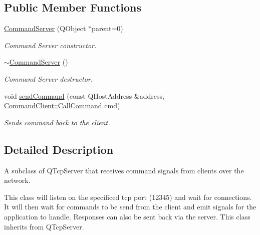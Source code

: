\subsection*{\-Public \-Member \-Functions}
\begin{DoxyCompactItemize}
\item 
\hyperlink{class_command_server_ae341a512a49c2453c306f5e4d576c052}{\-Command\-Server} (\-Q\-Object $\ast$parent=0)
\begin{DoxyCompactList}\small\item\em \-Command \-Server constructor. \end{DoxyCompactList}\item 
\hyperlink{class_command_server_a89f1d55bb111f7954d022e0c63d3b87f}{$\sim$\-Command\-Server} ()
\begin{DoxyCompactList}\small\item\em \-Command \-Server destructor. \end{DoxyCompactList}\item 
void \hyperlink{class_command_server_a1fc3321611893adbaecc4bdeca585570}{send\-Command} (const \-Q\-Host\-Address \&address, \hyperlink{class_command_client_aa99b17193724fef8aed2b2c724b0c243}{\-Command\-Client\-::\-Call\-Command} cmd)
\begin{DoxyCompactList}\small\item\em \-Sends command back to the client. \end{DoxyCompactList}\end{DoxyCompactItemize}


\subsection{\-Detailed \-Description}
\-A subclass of \-Q\-Tcp\-Server that receives command signals from clients over the network. 

\-This class will listen on the specificed tcp port (12345) and wait for connections. \-It will then wait for commands to be send from the client and emit signals for the application to handle. \-Responses can also be sent back via the server. \-This class inherits from \-Q\-Tcp\-Server. 

